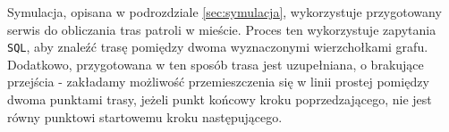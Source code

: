 \par Symulacja, opisana w podrozdziale \ref{sec:symulacja}, wykorzystuje przygotowany serwis do obliczania tras patroli w mieście. Proces ten wykorzystuje zapytania \texttt{SQL}, aby znaleźć trasę pomiędzy dwoma wyznaczonymi wierzchołkami grafu. Dodatkowo, przygotowana w ten sposób trasa jest uzupełniana, o brakujące przejścia - zakładamy możliwość przemieszczenia się w linii prostej pomiędzy dwoma punktami trasy, jeżeli punkt końcowy kroku poprzedzającego, nie jest równy punktowi startowemu kroku następującego.